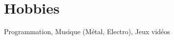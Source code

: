 \documentclass[10pt,a4paper,sans]{moderncv}
\begin{document}
\section{Hobbies}
Programmation, Musique (Métal, Electro), Jeux vidéos

\clearpage
%
%
\end{document}
